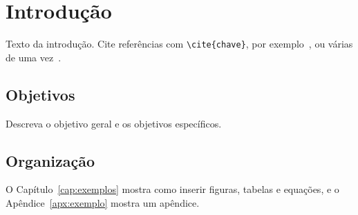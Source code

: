 \chapter{Introdução}
\label{cap:introducao}

Texto da introdução. Cite referências com \verb|\cite{chave}|, por exemplo~\cite{exemplo2024artigo},
ou várias de uma vez~\cite{exemplo2024artigo,exemplo2023livro}.

\section{Objetivos}
\label{sec:objetivos}

Descreva o objetivo geral e os objetivos específicos.

\section{Organização}

O Capítulo~\ref{cap:exemplos} mostra como inserir figuras, tabelas e equações, e o
Apêndice~\ref{apx:exemplo} mostra um apêndice.
